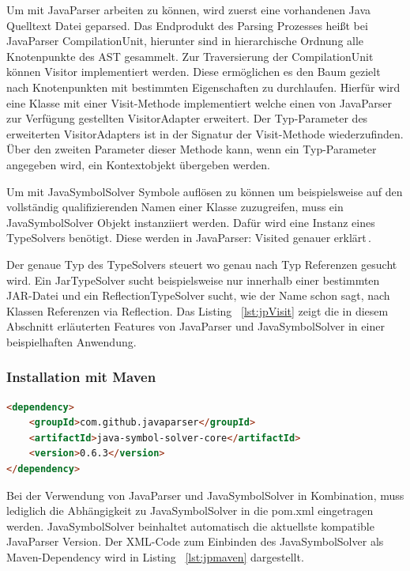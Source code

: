 \documentclass[12pt,oneside,a4paper,parskip]{scrbook}
\begin{document}
Um mit JavaParser arbeiten zu können, wird zuerst eine vorhandenen Java Quelltext Datei geparsed. Das Endprodukt des Parsing Prozesses heißt bei JavaParser CompilationUnit, hierunter sind in hierarchische Ordnung alle Knotenpunkte des AST gesammelt. Zur Traversierung der CompilationUnit können Visitor implementiert werden. Diese ermöglichen es den Baum gezielt nach Knotenpunkten mit bestimmten Eigenschaften zu durchlaufen. Hierfür wird eine Klasse mit einer Visit-Methode implementiert welche einen von JavaParser zur Verfügung gestellten VisitorAdapter erweitert. Der Typ-Parameter des erweiterten VisitorAdapters ist in der Signatur der Visit-Methode wiederzufinden. Über den zweiten Parameter dieser Methode kann, wenn ein Typ-Parameter angegeben wird, ein Kontextobjekt übergeben werden.

Um mit JavaSymbolSolver Symbole auflösen zu können um beispielsweise auf den vollständig qualifizierenden Namen einer Klasse zuzugreifen, muss ein JavaSymbolSolver Objekt instanziiert werden. Dafür wird eine Instanz eines TypeSolvers benötigt. Diese werden in JavaParser: Visited genauer erklärt\,\cite[S. 39ff.]{javaparser2017}. 

Der genaue Typ des TypeSolvers steuert wo genau nach Typ Referenzen gesucht wird. Ein JarTypeSolver sucht beispielsweise nur innerhalb einer bestimmten JAR-Datei und ein ReflectionTypeSolver sucht, wie der Name schon sagt, nach Klassen Referenzen via Reflection. Das Listing ~\ref{lst:jpVisit} zeigt die in diesem Abschnitt erläuterten Features von JavaParser und JavaSymbolSolver in einer beispielhaften Anwendung.

\subsubsection{Installation mit Maven}

\begin{lstlisting}[label=lst:jpmaven,
language=HTML,
firstnumber=1,
caption=XML-Code zum Einbinden von JavaParser und JavaSymbolSolver als Maven-Dependency]
<dependency>
	<groupId>com.github.javaparser</groupId>
	<artifactId>java-symbol-solver-core</artifactId>
	<version>0.6.3</version>
</dependency>
\end{lstlisting}

Bei der Verwendung von JavaParser und JavaSymbolSolver in Kombination, muss lediglich die Abhängigkeit zu JavaSymbolSolver in die pom.xml eingetragen werden. JavaSymbolSolver beinhaltet automatisch die aktuellste kompatible JavaParser Version. Der XML-Code zum Einbinden des JavaSymbolSolver als Maven-Dependency wird in Listing ~\ref{lst:jpmaven} dargestellt.
\end{document}
